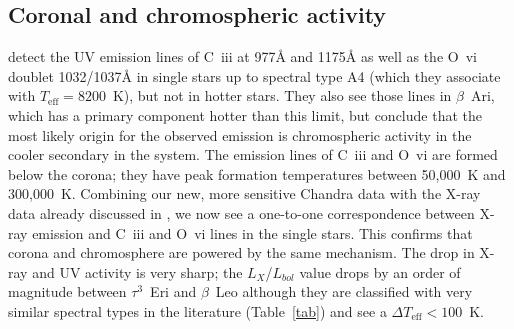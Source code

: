 \documentclass[linenumbers]{aastex631}
\begin{document}


\subsection{Coronal and chromospheric activity}
\cite{2002ApJ...579..800S} detect the UV emission lines
of C~{\sc iii} at 977\AA{} and 1175\AA{} as well as the O~{\sc vi}
doublet 1032/1037\AA{} in single stars up to spectral type A4 (which
they associate with $T_\mathrm{eff}=8200$~K), but not in hotter stars. They also see those
lines in $\beta$~Ari, which has a primary component hotter than this
limit, but conclude that the most likely origin for the observed
emission is chromospheric activity in the cooler secondary in the
system. The emission lines of C~{\sc iii} and O~{\sc vi} are formed
below the corona; they have peak formation temperatures between
50,000~K and 300,000~K. Combining our new, more sensitive Chandra data with the X-ray data already discussed in \cite{2002ApJ...579..800S}, 
we now see a one-to-one correspondence between X-ray emission and
C~{\sc iii} and O~{\sc vi} lines in the single stars. This confirms that corona and chromosphere are powered by the same mechanism.
The drop in X-ray and UV activity is very sharp; the $L_X$/$L_{bol}$ value drops by
an order of magnitude between $\tau^3$~Eri and
$\beta$~Leo although they are classified with very similar spectral types in the literature (Table~\ref{tab}) and \citet{2002ApJ...579..800S} see a $\Delta T_\mathrm{eff} < 100$~K.
\end{document}
